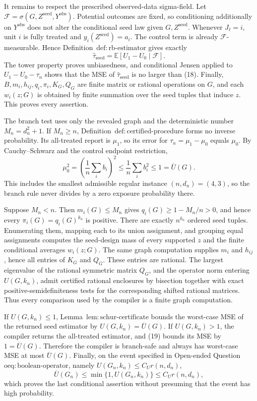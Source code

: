It remains to respect the prescribed observed-data sigma-field.  Let \(\mathcal F=\sigma(G,Z^{\mathrm{seed}},Y^{\mathrm{obs}})\).  Potential outcomes are fixed, so conditioning additionally on \(Y^{\mathrm{obs}}\) does not alter the conditional seed law given \(G,Z^{\mathrm{seed}}\).  Whenever \(J_\ell=i\), unit \(i\) is fully treated and \(y_i(Z^{\mathrm{seed}})=a_i\).  The control term is already \(\mathcal F\)-measurable.  Hence Definition~\(\mathrm{def{:}rb\mbox{-}estimator}\) gives exactly
\[
\widehat\tau_{\mathrm{seed}}=\mathbb E[U_1-U_0\mid\mathcal F].
\]
The tower property proves unbiasedness, and conditional Jensen applied to \(U_1-U_0-\tau_n\) shows that the MSE of \(\widehat\tau_{\mathrm{seed}}\) is no larger than (18).  Finally, \(B,m_i,h_{ij},q_i,\pi_i,K_G,Q_G\) are finite matrix or rational operations on \(G\), and each \(w_i(z;G)\) is obtained by finite summation over the seed tuples that induce \(z\).  This proves every assertion.

The branch test uses only the revealed graph and the deterministic number \(M_n=d_n^2+1\).  If \(M_n\ge n\), Definition~\(\mathrm{def{:}certified\mbox{-}procedure}\) forms no inverse probability.  Its all-treated report is \(\mu_1\), so its error for \(\tau_n=\mu_1-\mu_0\) equals \(\mu_0\).  By Cauchy--Schwarz and the control endpoint restriction,
\[
\mu_0^2=\left(\frac1n\sum_i b_i\right)^2\le\frac1n\sum_i b_i^2\le1=\overline U(G).
\tag{19}
\]
This includes the smallest admissible regular instance \((n,d_n)=(4,3)\), so the branch rule never divides by a zero exposure probability there.

Suppose \(M_n<n\).  Then \(m_i(G)\le M_n\) gives \(q_i(G)\ge1-M_n/n>0\), and hence every \(\pi_i(G)=q_i(G)^{k_n}\) is positive.  There are exactly \(n^{k_n}\) ordered seed tuples.  Enumerating them, mapping each to its union assignment, and grouping equal assignments computes the seed-design mass of every supported \(z\) and the finite conditional averages \(w_i(z;G)\).  The same graph computation supplies \(m_i\) and \(h_{ij}\), hence all entries of \(K_G\) and \(Q_G\).  These entries are rational.  The largest eigenvalue of the rational symmetric matrix \(Q_G\), and the operator norm entering \(U(G,k_n)\), admit certified rational enclosures by bisection together with exact positive-semidefiniteness tests for the corresponding shifted rational matrices.  Thus every comparison used by the compiler is a finite graph computation.

If \(U(G,k_n)\le1\), Lemma~\(\mathrm{lem{:}schur\mbox{-}certificate}\) bounds the worst-case MSE of the returned seed estimator by \(U(G,k_n)=\overline U(G)\).  If \(U(G,k_n)>1\), the compiler returns the all-treated estimator, and (19) bounds its MSE by \(1=\overline U(G)\).  Therefore the compiler is branch-safe and always has worst-case MSE at most \(\overline U(G)\).  Finally, on the event specified in Open-ended Question~\(\mathrm{oeq{:}boolean\mbox{-}operator}\), namely \(U(G_n,k_n)\le C_Ur(n,d_n)\),
\[
\overline U(G_n)\le\min\{1,U(G_n,k_n)\}\le C_Ur(n,d_n),
\]
which proves the last conditional assertion without presuming that the event has high probability.

